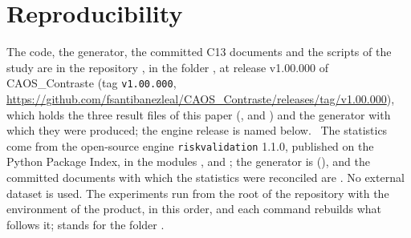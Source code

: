 \section{Reproducibility}
\label{sec:reproducibility}

The code, the generator, the committed C13 documents and the scripts of the study are in the repository , in the folder , at
release v1.00.000 of CAOS\_Contraste (tag \texttt{v1.00.000}, \url{https://github.com/fsantibanezleal/CAOS_Contraste/releases/tag/v1.00.000}), which holds the three result files of this paper (,  and ) and the generator with which they were produced; the engine release is named below.\ %
The statistics come from the open-source engine \texttt{riskvalidation} 1.1.0, published on the Python Package Index, in the modules ,  and ; the generator is  (), and the committed documents with which the statistics were reconciled are .
No external dataset is used.
The experiments run from the root of the repository with the environment of the product, in this order, and each command rebuilds what follows it;  stands for the folder .
